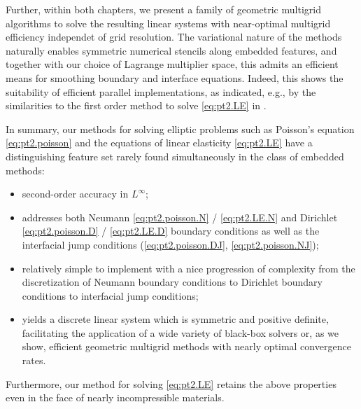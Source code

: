 Further, within both chapters, we present a family of geometric multigrid algorithms to solve the resulting linear systems with near-optimal multigrid efficiency independet of grid resolution. The variational nature of the methods naturally enables symmetric numerical stencils along embedded features, and together with our choice of Lagrange multiplier space, this admits an efficient means for smoothing boundary and interface equations. Indeed, this shows the suitability of efficient parallel implementations, as indicated, e.g., by the similarities to the first order method to solve \eqref{eq:pt2.LE} in \cite{Zhu.Yongning10}.

In summary, our methods for solving elliptic problems such as Poisson's equation \eqref{eq:pt2.poisson} and the equations of linear elasticity \eqref{eq:pt2.LE} have a distinguishing feature set rarely found simultaneously in the class of embedded methods:
\begin{itemize}
\item second-order accuracy in $L^{\infty}$;
\item addresses both Neumann \eqref{eq:pt2.poisson.N} / \eqref{eq:pt2.LE.N} and Dirichlet \eqref{eq:pt2.poisson.D} / \eqref{eq:pt2.LE.D} boundary conditions as well as the interfacial jump conditions (\ref{eq:pt2.poisson.DJ}, \ref{eq:pt2.poisson.NJ});
\item relatively simple to implement with a nice progression of complexity from the discretization of Neumann boundary conditions to Dirichlet boundary conditions to interfacial jump conditions;
\item yields a discrete linear system which is symmetric and positive definite, facilitating the application of a wide variety of black-box solvers or, as we show, efficient geometric multigrid methods with nearly optimal convergence rates.
\end{itemize}
Furthermore, our method for solving \eqref{eq:pt2.LE} retains the above properties even in the face of nearly incompressible materials.

\renewcommand{\thechapter}{\arabic{chapter}}
